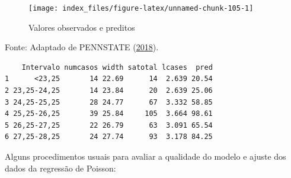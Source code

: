 \documentclass[12pt,brazil,oneside]{book}
\newenvironment{Shaded}{\begin{snugshade}}{\end{snugshade}}
\newcommand{\DataTypeTok}[1]{\textcolor[rgb]{0.13,0.29,0.53}{#1}}
\newcommand{\DecValTok}[1]{\textcolor[rgb]{0.00,0.00,0.81}{#1}}
\newcommand{\KeywordTok}[1]{\textcolor[rgb]{0.13,0.29,0.53}{\textbf{#1}}}
\newcommand{\NormalTok}[1]{#1}
\newcommand{\OperatorTok}[1]{\textcolor[rgb]{0.81,0.36,0.00}{\textbf{#1}}}
\newcommand{\StringTok}[1]{\textcolor[rgb]{0.31,0.60,0.02}{#1}}
\begin{document}
\begin{Shaded}
\end{Shaded}

\begin{figure}[H]

{\centering \texttt{[image: index\_files/figure-latex/unnamed-chunk-105-1]} 

}

\caption{Valores observados e preditos}\label{fig:unnamed-chunk-105}
\end{figure}

Fonte: Adaptado de PENNSTATE (\protect\hyperlink{ref-penn2018}{2018}).

\begin{Shaded}
\end{Shaded}

\begin{verbatim}
    Intervalo numcasos width satotal lcases  pred
1      <23,25       14 22.69      14  2.639 20.54
2 23,25-24,25       14 23.84      20  2.639 25.06
3 24,25-25,25       28 24.77      67  3.332 58.85
4 25,25-26,25       39 25.84     105  3.664 98.61
5 26,25-27,25       22 26.79      63  3.091 65.54
6 27,25-28,25       24 27.74      93  3.178 84.25
\end{verbatim}

Alguns procedimentos usuais para avaliar a qualidade do modelo e ajuste dos dados da regressão de Poisson:
\end{document}
